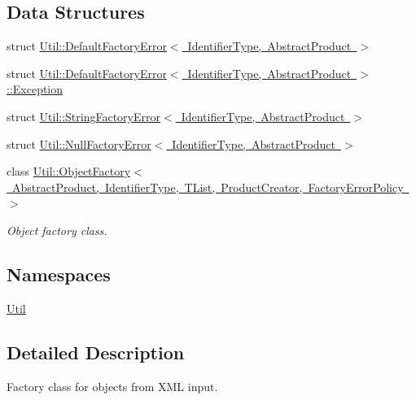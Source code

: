 \subsection*{Data Structures}
\begin{DoxyCompactItemize}
\item 
struct \mbox{\hyperlink{structUtil_1_1DefaultFactoryError}{Util\+::\+Default\+Factory\+Error$<$ Identifier\+Type, Abstract\+Product $>$}}
\item 
struct \mbox{\hyperlink{structUtil_1_1DefaultFactoryError_1_1Exception}{Util\+::\+Default\+Factory\+Error$<$ Identifier\+Type, Abstract\+Product $>$\+::\+Exception}}
\item 
struct \mbox{\hyperlink{structUtil_1_1StringFactoryError}{Util\+::\+String\+Factory\+Error$<$ Identifier\+Type, Abstract\+Product $>$}}
\item 
struct \mbox{\hyperlink{structUtil_1_1NullFactoryError}{Util\+::\+Null\+Factory\+Error$<$ Identifier\+Type, Abstract\+Product $>$}}
\item 
class \mbox{\hyperlink{classUtil_1_1ObjectFactory}{Util\+::\+Object\+Factory$<$ Abstract\+Product, Identifier\+Type, T\+List, Product\+Creator, Factory\+Error\+Policy $>$}}
\begin{DoxyCompactList}\small\item\em Object factory class. \end{DoxyCompactList}\end{DoxyCompactItemize}
\subsection*{Namespaces}
\begin{DoxyCompactItemize}
\item 
 \mbox{\hyperlink{namespaceUtil}{Util}}
\end{DoxyCompactItemize}


\subsection{Detailed Description}
Factory class for objects from X\+ML input. 

